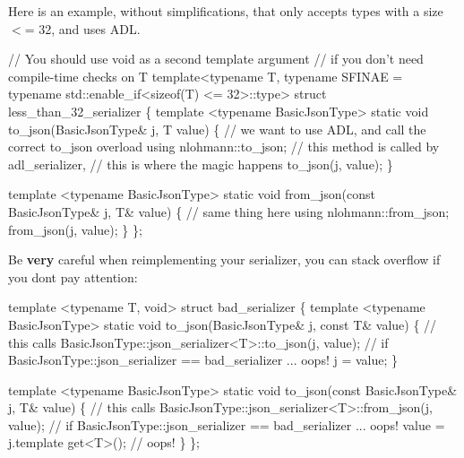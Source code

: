 Here is an example, without simplifications, that only accepts types with a size $<$= 32, and uses A\+DL.


\begin{DoxyCode}
\textcolor{comment}{// You should use void as a second template argument}
\textcolor{comment}{// if you don't need compile-time checks on T}
template<typename T, typename SFINAE = typename std::enable\_if<sizeof(T) <= 32>::type>
\textcolor{keyword}{struct }less\_than\_32\_serializer \{
    \textcolor{keyword}{template} <\textcolor{keyword}{typename} BasicJsonType>
    \textcolor{keyword}{static} \textcolor{keywordtype}{void} to\_json(BasicJsonType& j, T value) \{
        \textcolor{comment}{// we want to use ADL, and call the correct to\_json overload}
        \textcolor{keyword}{using} nlohmann::to\_json; \textcolor{comment}{// this method is called by adl\_serializer,}
                                 \textcolor{comment}{// this is where the magic happens}
        to\_json(j, value);
    \}

    \textcolor{keyword}{template} <\textcolor{keyword}{typename} BasicJsonType>
    \textcolor{keyword}{static} \textcolor{keywordtype}{void} from\_json(\textcolor{keyword}{const} BasicJsonType& j, T& value) \{
        \textcolor{comment}{// same thing here}
        \textcolor{keyword}{using} nlohmann::from\_json;
        from\_json(j, value);
    \}
\};
\end{DoxyCode}


Be {\bfseries very} careful when reimplementing your serializer, you can stack overflow if you don\textquotesingle{}t pay attention\+:


\begin{DoxyCode}
\textcolor{keyword}{template} <\textcolor{keyword}{typename} T, \textcolor{keywordtype}{void}>
\textcolor{keyword}{struct }bad\_serializer
\{
    \textcolor{keyword}{template} <\textcolor{keyword}{typename} BasicJsonType>
    \textcolor{keyword}{static} \textcolor{keywordtype}{void} to\_json(BasicJsonType& j, \textcolor{keyword}{const} T& value) \{
      \textcolor{comment}{// this calls BasicJsonType::json\_serializer<T>::to\_json(j, value);}
      \textcolor{comment}{// if BasicJsonType::json\_serializer == bad\_serializer ... oops!}
      j = value;
    \}

    \textcolor{keyword}{template} <\textcolor{keyword}{typename} BasicJsonType>
    \textcolor{keyword}{static} \textcolor{keywordtype}{void} to\_json(\textcolor{keyword}{const} BasicJsonType& j, T& value) \{
      \textcolor{comment}{// this calls BasicJsonType::json\_serializer<T>::from\_json(j, value);}
      \textcolor{comment}{// if BasicJsonType::json\_serializer == bad\_serializer ... oops!}
      value = j.template get<T>(); \textcolor{comment}{// oops!}
    \}
\};
\end{DoxyCode}


